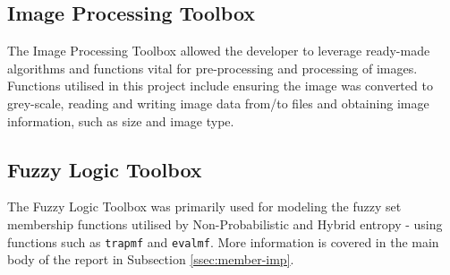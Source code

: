 \subsection{Image Processing Toolbox}

The Image Processing Toolbox \cite{image_toolbox} allowed the developer to leverage ready-made algorithms and functions vital for pre-processing and processing of images. Functions utilised in this project include ensuring the image was converted to grey-scale, reading and writing image data from/to files and obtaining image information, such as size and image type.

\subsection{Fuzzy Logic Toolbox}

The Fuzzy Logic Toolbox \cite{fuzzy_toolbox} was primarily used for modeling the fuzzy set membership functions utilised by Non-Probabilistic and Hybrid entropy - using functions such as \texttt{trapmf} and \texttt{evalmf}. More information is covered in the main body of the report in Subsection \ref{ssec:member-imp}.

